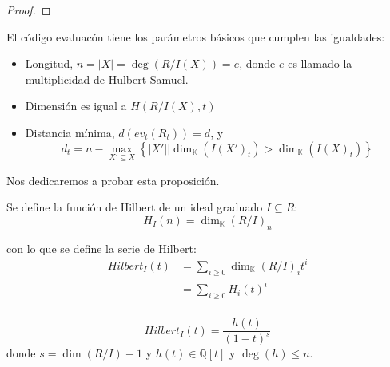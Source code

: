 \documentclass[12pt]{report}
\newcounter{it}
\theoremstyle{largebreak}
\newcommand\abs[1]{\ensuremath{\left|#1\right|}}
\begin{document}
    \begin{proof}
        
    \end{proof}

    \begin{propo}
        El código evaluacón tiene los parámetros básicos que cumplen las igualdades:
        \begin{itemize}
            \item Longitud, $n=\abs{X}=\deg\left(R/I(X) \right)=e$, donde $e$ es llamado la multiplicidad de Hulbert-Samuel.
            \item Dimensión es igual a $H(R/I(X),t)$
            \item Distancia mínima, $d(ev_t(R_t))=d$, y
            \begin{equation*}
                d_t=n-\max_{ X'\subseteq X}\left\{\abs{X'}\Big|\dim_{\mathbb{K}}(I(X')_t)>\dim_{\mathbb{K}}(I(X)_t) \right\}
            \end{equation*}
        \end{itemize}
    \end{propo}

    Nos dedicaremos a probar esta proposición.

    \begin{mydef}
        Se define la función de Hilbert de un ideal graduado $I\subseteq R$:
        \begin{equation*}
            H_I(n)=\dim_\mathbb{K}\left(R/I \right)_n
        \end{equation*}
    \end{mydef}

    \begin{mydef}
        con lo que se define la serie de Hilbert:
        \begin{equation*}
            \begin{split}
                Hilbert_I(t)&=\sum_{ i\geq0}\dim_{\mathbb{K}}(R/I)_it^i\\
                &=\sum_{ i\geq0}H_i(t)^i\\
            \end{split}
        \end{equation*}        
    \end{mydef}

    \begin{theor}
        \begin{equation*}
            Hilbert_I(t)=\frac{h(t)}{(1-t)^s}
        \end{equation*}
        donde $s=\dim(R/I)-1$ y $h(t)\in\mathbb{Q}[t]$ y $\deg(h)\leq n$.
    \end{theor}
\end{document}
